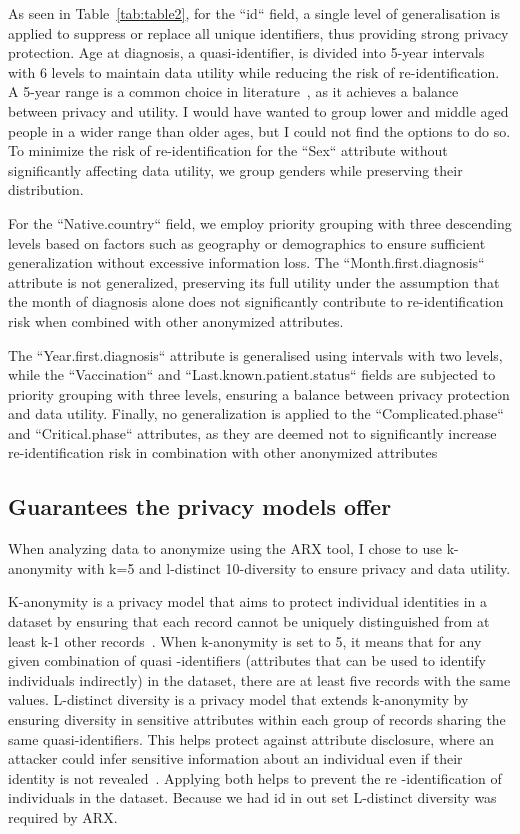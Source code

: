 As seen in Table~\ref{tab:table2}, for the ``id`` field, a single level of generalisation is applied to suppress or replace all unique
identifiers, thus
providing
strong privacy protection. Age at diagnosis, a quasi-identifier, is divided into 5-year intervals with 6 levels to maintain data utility
while reducing the risk of re-identification. A 5-year range is a common choice in literature~\cite[672]{el2009globally}, as it achieves a balance between privacy
and utility. I would have wanted to group lower and middle aged people in a wider range than older ages, but I could not find the options
to do so.
To
minimize the risk of re-identification for the
``Sex``
attribute without significantly affecting data utility, we group genders while preserving their distribution.

For the ``Native.country`` field, we employ priority grouping with three descending levels based on factors such as geography or demographics to ensure sufficient generalization without excessive information loss. The ``Month.first.diagnosis`` attribute is not generalized, preserving its full utility under the assumption that the month of diagnosis alone does not significantly contribute to re-identification risk when combined with other anonymized attributes.

The ``Year.first.diagnosis`` attribute is generalised using intervals with two levels, while the ``Vaccination`` and ``Last.known.patient.status`` fields are subjected to priority grouping with three levels, ensuring a balance between privacy protection and data utility. Finally, no generalization is applied to the ``Complicated.phase`` and ``Critical.phase`` attributes, as they are deemed not to significantly increase re-identification risk in combination with other anonymized attributes

\subsection{Guarantees the privacy models offer}\label{subsec:guarantees-the-privacy-models-offer}

When analyzing data to anonymize using the ARX tool, I chose to use k-anonymity with k=5 and l-distinct 10-diversity to ensure privacy
and data utility.

K-anonymity is a privacy model that aims to protect individual identities in a dataset by ensuring that each record cannot be uniquely
distinguished from at least k-1 other records~\cite[]{sweeney2002k}.
When k-anonymity is set to 5, it means that for any given
combination of quasi
-identifiers (attributes that can be used to identify individuals indirectly) in the dataset, there are at least five records with the same
values.
L-distinct diversity is a privacy model that extends k-anonymity by ensuring diversity in sensitive attributes within each group
of records sharing the same quasi-identifiers.
This helps protect against attribute disclosure, where an attacker could infer sensitive
information about an individual even if their identity is not revealed~\cite[]{sweeney2002k}.
Applying both helps to prevent the re
-identification of individuals in the dataset.
Because we had id in out set L-distinct diversity was required by ARX.

